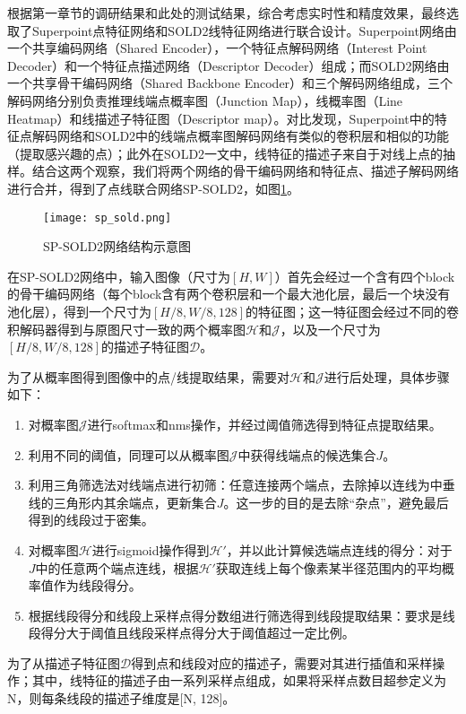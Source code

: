 根据第一章节的调研结果和此处的测试结果，综合考虑实时性和精度效果，最终选取了Superpoint\cite{detone2018superpoint}点特征网络和SOLD2\cite{pautrat2021sold2}线特征网络进行联合设计。Superpoint网络由一个共享编码网络（Shared Encoder），一个特征点解码网络（Interest Point Decoder）和一个特征点描述网络（Descriptor Decoder）组成；而SOLD2网络由一个共享骨干编码网络（Shared Backbone Encoder）和三个解码网络组成，三个解码网络分别负责推理线端点概率图（Junction Map），线概率图（Line Heatmap）和线描述子特征图（Descriptor map）。对比发现，Superpoint中的特征点解码网络和SOLD2中的线端点概率图解码网络有类似的卷积层和相似的功能（提取感兴趣的点）；此外在SOLD2一文中，线特征的描述子来自于对线上点的抽样。结合这两个观察，我们将两个网络的骨干编码网络和特征点、描述子解码网络进行合并，得到了点线联合网络SP-SOLD2，如图\ref{fig_sp_sold}。
\begin{figure}
  \centering
  \texttt{[image: sp\_sold.png]}
  \caption{SP-SOLD2网络结构示意图}
  \label{fig_sp_sold}
\end{figure}

在SP-SOLD2网络中，输入图像（尺寸为$[H, W]$）首先会经过一个含有四个block的骨干编码网络（每个block含有两个卷积层和一个最大池化层，最后一个块没有池化层），得到一个尺寸为$[H/8, W/8, 128]$的特征图；这一特征图会经过不同的卷积解码器得到与原图尺寸一致的两个概率图$\mathcal{H}$和$\mathcal{J}$，以及一个尺寸为$[H/8, W/8, 128]$的描述子特征图$\mathcal{D}$。

为了从概率图得到图像中的点/线提取结果，需要对$\mathcal{H}$和$\mathcal{J}$进行后处理，具体步骤如下：
\begin{enumerate}
  \item 对概率图$\mathcal{J}$进行softmax和nms操作，并经过阈值筛选得到特征点提取结果。
  \item 利用不同的阈值，同理可以从概率图$\mathcal{J}$中获得线端点的候选集合$J$。
  \item 利用三角筛选法对线端点进行初筛：任意连接两个端点，去除掉以连线为中垂线的三角形内其余端点，更新集合$J$。这一步的目的是去除“杂点”，避免最后得到的线段过于密集。
  \item 对概率图$\mathcal{H}$进行sigmoid操作得到$\mathcal{H'}$，并以此计算候选端点连线的得分：对于$J$中的任意两个端点连线，根据$\mathcal{H'}$获取连线上每个像素某半径范围内的平均概率值作为线段得分。
  \item 根据线段得分和线段上采样点得分数组进行筛选得到线段提取结果：要求是线段得分大于阈值且线段采样点得分大于阈值超过一定比例。
\end{enumerate}
为了从描述子特征图$\mathcal{D}$得到点和线段对应的描述子，需要对其进行插值和采样操作；其中，线特征的描述子由一系列采样点组成，如果将采样点数目超参定义为N，则每条线段的描述子维度是[N, 128]。

